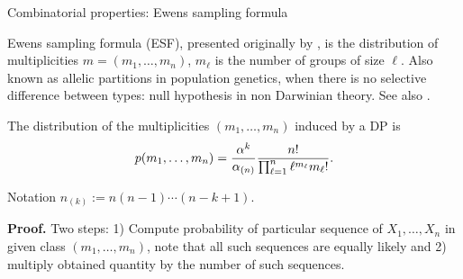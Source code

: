 %
%
%



\begin{frame}[allowframebreaks]{Combinatorial properties: Ewens sampling formula}

Ewens sampling formula (ESF), presented originally by \citet{ewens1972sampling}, is the distribution of multiplicities $m=(m_1,\ldots, m_n)$, $m_\ell$ is the number of groups of size $\ell$.
Also known as allelic partitions in population genetics, when there is no selective difference between types: null hypothesis in non Darwinian theory.
See also \citet{antoniak1974mixtures}.

\begin{proposition}\label{ESF}
The distribution of the multiplicities $(m_1,\ldots, m_n)$ induced by a DP is
\begin{equation*}
    p(m_1,\ldots, m_n)=\frac{\alpha^k}{\alpha_{(n)}}\frac{n!}{\prod_{\ell=1}^n \ell^{m_\ell}m_\ell!}.
\end{equation*}
\end{proposition}\bigskip

Notation $n_{(k)}:=n(n-1)\cdots(n-k+1)$.




\framebreak
\textbf{Proof.}
Two steps: 1) Compute probability of particular sequence of $X_1, \ldots, X_n$ in given class $(m_1,\ldots,m_n)$, note that all such sequences are equally likely and 2) multiply obtained quantity by the number of such sequences. 


\end{frame}
